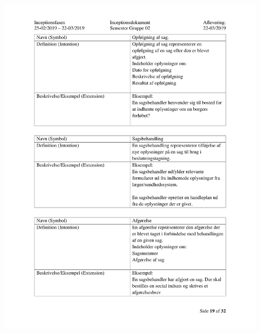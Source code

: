 \begin{figure}[hb]
  \includegraphics[scale = 0.33]{./PNG/Inceptions/Gruppe 02 + InceptionsDokument-20.jpg} 
\end{figure}

